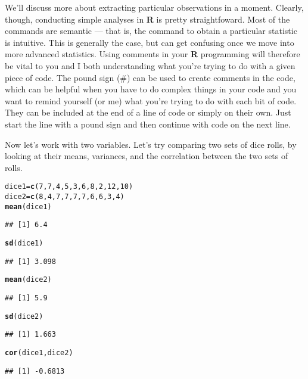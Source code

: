 \documentclass[12pt]{article}\usepackage[]{graphicx}\usepackage[]{color}
\makeatletter
\newcommand{\hlnum}[1]{\textcolor[rgb]{0.686,0.059,0.569}{#1}}%
\newcommand{\hlstd}[1]{\textcolor[rgb]{0.345,0.345,0.345}{#1}}%
\newcommand{\hlkwb}[1]{\textcolor[rgb]{0.69,0.353,0.396}{#1}}%
\newcommand{\hlkwd}[1]{\textcolor[rgb]{0.737,0.353,0.396}{\textbf{#1}}}%
\newenvironment{kframe}{%
 \def\at@end@of@kframe{}%
 \ifinner\ifhmode%
  \def\at@end@of@kframe{\end{minipage}}%
  \begin{minipage}{\columnwidth}%
 \fi\fi%
 \def\FrameCommand##1{\hskip\@totalleftmargin \hskip-\fboxsep
 \colorbox{shadecolor}{##1}\hskip-\fboxsep
     \hskip-\linewidth \hskip-\@totalleftmargin \hskip\columnwidth}%
 \MakeFramed {\advance\hsize-\width
   \@totalleftmargin\z@ \linewidth\hsize
   \@setminipage}}%
 {\par\unskip\endMakeFramed%
 \at@end@of@kframe}
\newenvironment{knitrout}{}{} %
\makeatother
\begin{document}
We'll discuss more about extracting particular observations in a moment. Clearly, though, conducting simple analyses in \textbf{R} is pretty straightfoward. Most of the commands are semantic --- that is, the command to obtain a particular statistic is intuitive. This is generally the case, but can get confusing once we move into more advanced statistics. Using comments in your \textbf{R} programming will therefore be vital to you and I both understanding what you're trying to do with a given piece of code. The pound sign (\#) can be used to create comments in the code, which can be helpful when you have to do complex things in your code and you want to remind yourself (or me) what you're trying to do with each bit of code. They can be included at the end of a line of code or simply on their own. Just start the line with a pound sign and then continue with code on the next line.

Now let's work with two variables. Let's try comparing two sets of dice rolls, by looking at their means, variances, and the correlation between the two sets of rolls.
\begin{knitrout}
\color{fgcolor}\begin{kframe}
\begin{alltt}
\hlstd{dice1} \hlkwb{=} \hlkwd{c}\hlstd{(}\hlnum{7}\hlstd{,} \hlnum{7}\hlstd{,} \hlnum{4}\hlstd{,} \hlnum{5}\hlstd{,} \hlnum{3}\hlstd{,} \hlnum{6}\hlstd{,} \hlnum{8}\hlstd{,} \hlnum{2}\hlstd{,} \hlnum{12}\hlstd{,} \hlnum{10}\hlstd{)}
\hlstd{dice2} \hlkwb{=} \hlkwd{c}\hlstd{(}\hlnum{8}\hlstd{,} \hlnum{4}\hlstd{,} \hlnum{7}\hlstd{,} \hlnum{7}\hlstd{,} \hlnum{7}\hlstd{,} \hlnum{7}\hlstd{,} \hlnum{6}\hlstd{,} \hlnum{6}\hlstd{,} \hlnum{3}\hlstd{,} \hlnum{4}\hlstd{)}
\hlkwd{mean}\hlstd{(dice1)}
\end{alltt}
\begin{verbatim}
## [1] 6.4
\end{verbatim}
\begin{alltt}
\hlkwd{sd}\hlstd{(dice1)}
\end{alltt}
\begin{verbatim}
## [1] 3.098
\end{verbatim}
\begin{alltt}
\hlkwd{mean}\hlstd{(dice2)}
\end{alltt}
\begin{verbatim}
## [1] 5.9
\end{verbatim}
\begin{alltt}
\hlkwd{sd}\hlstd{(dice2)}
\end{alltt}
\begin{verbatim}
## [1] 1.663
\end{verbatim}
\begin{alltt}
\hlkwd{cor}\hlstd{(dice1, dice2)}
\end{alltt}
\begin{verbatim}
## [1] -0.6813
\end{verbatim}
\end{kframe}
\end{knitrout}
\end{document}
